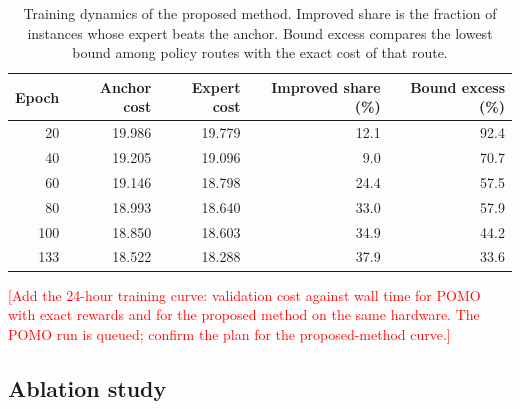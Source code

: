 \documentclass[preprint,12pt,authoryear]{elsarticle}
\newcommand{\placeholder}[1]{\textcolor{red}{[#1]}}
\begin{document}
\begin{table}[t]
\centering
\caption{Training dynamics of the proposed method. Improved share is the fraction of instances whose expert beats the anchor. Bound excess compares the lowest bound among policy routes with the exact cost of that route.}
\label{tab:dynamics}
\small
\begin{tabular}{rrrrr}
\toprule
Epoch & Anchor cost & Expert cost & Improved share (\%) & Bound excess (\%) \\
\midrule
20 & 19.986 & 19.779 & 12.1 & 92.4 \\
40 & 19.205 & 19.096 & 9.0 & 70.7 \\
60 & 19.146 & 18.798 & 24.4 & 57.5 \\
80 & 18.993 & 18.640 & 33.0 & 57.9 \\
100 & 18.850 & 18.603 & 34.9 & 44.2 \\
133 & 18.522 & 18.288 & 37.9 & 33.6 \\
\bottomrule
\end{tabular}
\end{table}

\begin{table}[t]
\centering
\caption{Training budgets of G200 and E133.}
\label{tab:budget}
\small
{}
\end{table}

\placeholder{Add the 24-hour training curve: validation cost against wall time for POMO with exact rewards and for the proposed method on the same hardware. The POMO run is queued; confirm the plan for the proposed-method curve.}

\subsection{Ablation study}
\label{sec:ablation}
\end{document}
